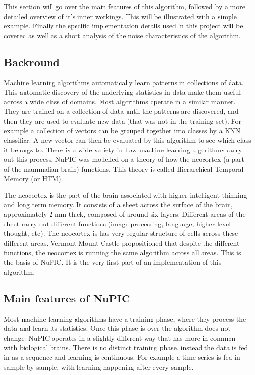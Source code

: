 \documentclass[a4paper]{jpconf}
\begin{document}
	This section will go over the main features of this algorithm, followed by a more detailed overview of it's inner workings. This will be illustrated with a simple example. Finally the specific implementation details used in this project will be covered as well as a short analysis of the noise characteristics of the algorithm.

	\subsection{Backround}
		Machine learning algorithms automatically learn patterns in collections of data. This automatic discovery of the underlying statistics in data make them useful across a wide class of domains. Most algorithms operate in a similar manner. They are trained on a collection of data until the patterns are discovered, and then they are used to evaluate new data (that was not in the training set). For example a collection of vectors can be grouped together into classes by a KNN classifier. A new vector can then be evaluated by this algorithm to see which class it belongs to. There is a wide variety in how machine learning algorithms carry out this process. NuPIC was modelled on a theory of how the neocortex (a part of the mammalian brain) functions. This theory is called Hierarchical Temporal Memory (or HTM).
		
		The neocortex is the part of the brain associated with higher intelligent thinking and long term memory. It consists of a sheet across the surface of the brain, approximately 2 mm thick, composed of around six layers. Different areas of the sheet carry out different functions (image processing, language, higher level thought, etc). The neocortex is has very regular structure of cells across these different areas. Vermont Mount-Castle propositioned that despite the different functions, the neocortex is running the same algorithm across all areas. This is the basis of NuPIC. It is the very first part of an implementation of this algorithm.
	
	\subsection{Main features of NuPIC}
		Most machine learning algorithms have a training phase, where they process the data and learn its statistics. Once this phase is over the algorithm does not change. NuPIC operates in a slightly different way that has more in common with biological brains. There is no distinct training phase, instead the data is fed in as a sequence and learning is continuous. For example a time series is fed in sample by sample, with learning happening after every sample.
		
\end{document}

